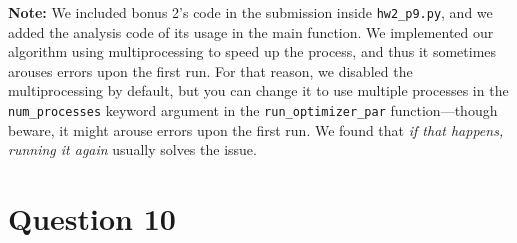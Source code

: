 \documentclass{article}
\begin{document}
\textbf{Note:} We included bonus 2's code in the submission inside \texttt{hw2\_p9.py}, and we added the analysis code of its usage in the main function. We implemented our algorithm using multiprocessing to speed up the process, and thus it sometimes arouses errors upon the first run. For that reason, we disabled the multiprocessing by default, but you can change it to use multiple processes in the \texttt{num\_processes} keyword argument in the \texttt{run\_optimizer\_par} function---though beware, it might arouse errors upon the first run. We found that \textit{if that happens, running it again} usually solves the issue.

\FloatBarrier

\section{Question 10}
\end{document}
